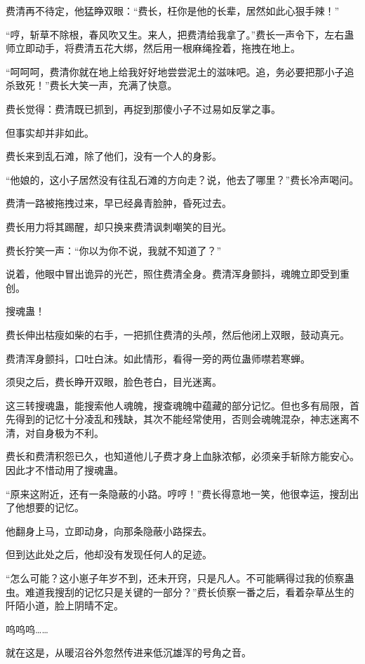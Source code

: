 \begin{this_body}
费清再不待定，他猛睁双眼：“费长，枉你是他的长辈，居然如此心狠手辣！”

“哼，斩草不除根，春风吹又生。来人，把费清给我拿了。”费长一声令下，左右蛊师立即动手，将费清五花大绑，然后用一根麻绳拴着，拖拽在地上。

“呵呵呵，费清你就在地上给我好好地尝尝泥土的滋味吧。追，务必要把那小子追杀致死！”费长大笑一声，充满了快意。

费长觉得：费清既已抓到，再捉到那傻小子不过易如反掌之事。

但事实却并非如此。

费长来到乱石滩，除了他们，没有一个人的身影。

“他娘的，这小子居然没有往乱石滩的方向走？说，他去了哪里？”费长冷声喝问。

费清一路被拖拽过来，早已经鼻青脸肿，昏死过去。

费长用力将其踢醒，却只换来费清讽刺嘲笑的目光。

费长狞笑一声：“你以为你不说，我就不知道了？”

说着，他眼中冒出诡异的光芒，照住费清全身。费清浑身颤抖，魂魄立即受到重创。

搜魂蛊！

费长伸出枯瘦如柴的右手，一把抓住费清的头颅，然后他闭上双眼，鼓动真元。

费清浑身颤抖，口吐白沫。如此情形，看得一旁的两位蛊师噤若寒蝉。

须臾之后，费长睁开双眼，脸色苍白，目光迷离。

这三转搜魂蛊，能搜索他人魂魄，搜查魂魄中蕴藏的部分记忆。但也多有局限，首先得到的记忆十分凌乱和残缺，其次不能经常使用，否则会魂魄混杂，神志迷离不清，对自身极为不利。

费长和费清积怨已久，也知道他儿子费才身上血脉浓郁，必须亲手斩除方能安心。因此才不惜动用了搜魂蛊。

“原来这附近，还有一条隐蔽的小路。哼哼！”费长得意地一笑，他很幸运，搜刮出了他想要的记忆。

他翻身上马，立即动身，向那条隐蔽小路探去。

但到达此处之后，他却没有发现任何人的足迹。

“怎么可能？这小崽子年岁不到，还未开窍，只是凡人。不可能瞒得过我的侦察蛊虫。难道我搜刮的记忆只是关键的一部分？”费长侦察一番之后，看着杂草丛生的阡陌小道，脸上阴晴不定。

呜呜呜……

就在这是，从暖沼谷外忽然传进来低沉雄浑的号角之音。


\end{this_body}
